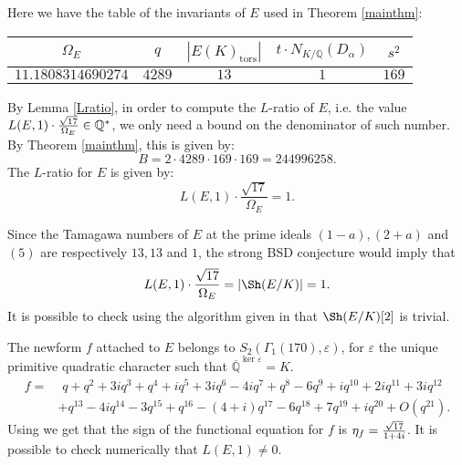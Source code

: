 \documentclass[11pt]{amsart}
\theoremstyle{definition}
\begin{document}
		Here we have the table of the invariants of $E$ used in Theorem \ref{mainthm}:
			\begin{center}
				\begin{tabular}{| c | c | c | c | c |}
			    \hline
				$\Omega_E$ & $q$ & $|E(K)_{\text{tors}}|$ & $t\cdot N_{K/{\mathbb{Q}}}(D_{\alpha})$  & $s^2$ \\ \hline\hline
			    $11.1808314690274$ & $4289$ & $13$ & $1$ & $169$\\ \hline
			  \end{tabular}
		\end{center}
		By Lemma \ref{Lratio}, in order to compute the $L$-ratio of $E$, i.e. the value ${\displaystyle} L(E,1)\cdot \frac{\sqrt{17}}{\Omega_E}\in {\mathbb{Q}}^*$, we only need a bound on the denominator of such number. By Theorem \ref{mainthm}, this is given by:
		$$B=2\cdot 4289\cdot 169\cdot 169=244996258.$$
		The $L$-ratio for $E$ is given by:
		$$L(E,1)\cdot\frac{\sqrt{17}}{\Omega_E}=1.$$
		
		Since the Tamagawa numbers of $E$ at the prime ideals $(1-a),(2+a)$ and $(5)$ are respectively $13,13$ and $1$, the strong BSD conjecture would imply that
		$$L(E,1)\cdot\frac{\sqrt{17}}{\Omega_E}=|\Sh(E/K)|=1.$$
		It is possible to check using the algorithm given in \cite{sim} that $\Sh(E/K)[2]$ is trivial.

		The newform $f$ attached to $E$ belongs to $S_2(\Gamma_1(170),\varepsilon)$, for $\varepsilon$ the unique primitive quadratic character such that ${\overline{\mathbb{Q}}}^{\ker\varepsilon}=K$.
		\begin{equation*}\begin{split}
		f= &\,\, q + q^{2} + 3iq^{3} + q^{4} + iq^{5} + 3iq^{6} -4iq^{7} + q^{8} - 6q^{9} + iq^{10} + 2iq^{11} + 3iq^{12}\\
		 & + q^{13} -4iq^{14} - 3q^{15} + q^{16} -(4+i)q^{17} - 6q^{18} + 7q^{19} + iq^{20} + O(q^{21}).
		\end{split}
		\end{equation*}
		Using \cite[Theorem 2.1]{atkli} we get that the sign of the functional equation for $f$ is ${\displaystyle} \eta_f=\frac{\sqrt{17}}{1+4i}$. It is possible to check numerically that $L(E,1)\neq 0$.
		

{}
\end{document}
